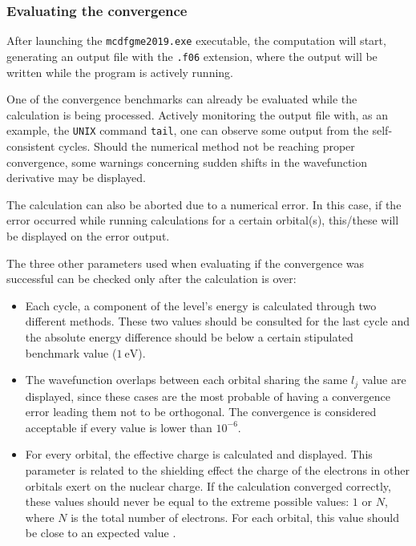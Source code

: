 \subsubsection{Evaluating the convergence}
After launching the \verb|mcdfgme2019.exe| executable, the computation will start, generating an output file with the \verb|.f06| extension, where the output will be written while the program is actively running.

One of the convergence benchmarks can already be evaluated while the calculation is being processed. Actively monitoring the output file with, as an example, the \verb|UNIX| command \verb|tail|, one can observe some output from the self-consistent cycles. Should the numerical method not be reaching proper convergence, some warnings concerning sudden shifts in the wavefunction derivative may be displayed.

The calculation can also be aborted due to a numerical error. In this case, if the error occurred while running calculations for a certain orbital(s), this/these will be displayed on the error output. 

The three other parameters used when evaluating if the convergence was successful can be checked only after the calculation is over:

\begin{itemize}
    \item Each cycle, a component of the level's energy is calculated through two different methods. These two values should be consulted for the last cycle and the absolute energy difference should be below a certain stipulated benchmark value ($1\ \si{\electronvolt}$).
    \item The wavefunction overlaps between each orbital sharing the same $l_j$ value are displayed, since these cases are the most probable of having a convergence error leading them not to be orthogonal. The convergence is considered acceptable if every value is lower than $10^{-6}$.
    \item For every orbital, the effective charge is calculated and displayed. This parameter is related to the shielding effect the charge of the electrons in other orbitals exert on the nuclear charge. If the calculation converged correctly, these values should never be equal to the extreme possible values: $1$ or $N$, where $N$ is the total number of electrons. For each orbital, this value should be close to an expected value .
\end{itemize}





